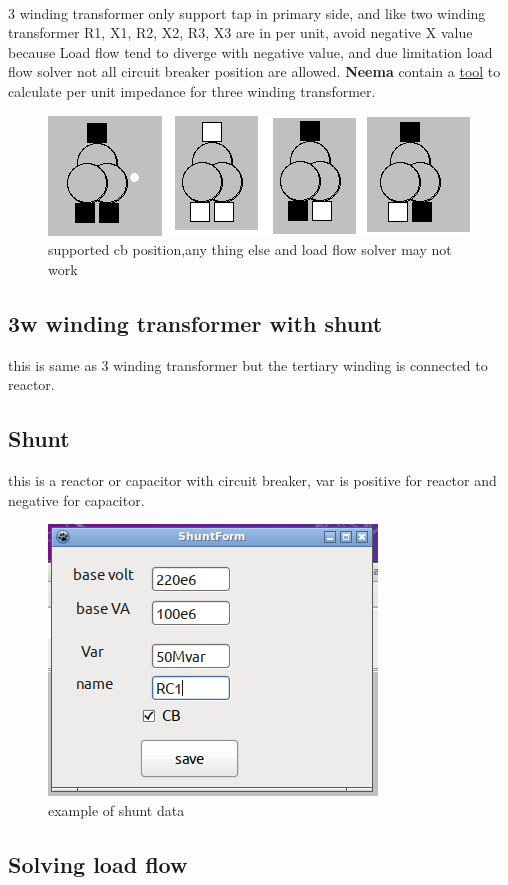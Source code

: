 \documentclass{article}
\begin{document}
\paragraph{} 3 winding transformer only support tap in primary side, and like two winding transformer R1, X1, R2, X2, R3, X3 are in per unit, avoid negative X value because Load flow tend to diverge with negative value,  and due limitation load flow solver not all circuit breaker position are allowed. \textbf{Neema} contain a \hyperref[sec:T3wtool]{tool} to calculate per unit impedance for three winding transformer.
\begin{figure}[H]
	\includegraphics[width=\linewidth]{t3wcb.png}
	\caption{supported cb position,any thing else and load flow solver may not work}
	\label{fig:t2w}
\end{figure}
\subsection{3w winding transformer with shunt}
this is same as 3 winding transformer but the tertiary winding is connected to reactor. 
\subsection{Shunt}
this is a reactor or capacitor with circuit breaker, var is positive for reactor and negative for capacitor.
\begin{figure}[H]
	\includegraphics[width=5 cm]{shuntedit.png}
	\caption{example of shunt data}
	\label{fig:shuntex}
\end{figure}
\subsection{Solving load flow}
\end{document}

